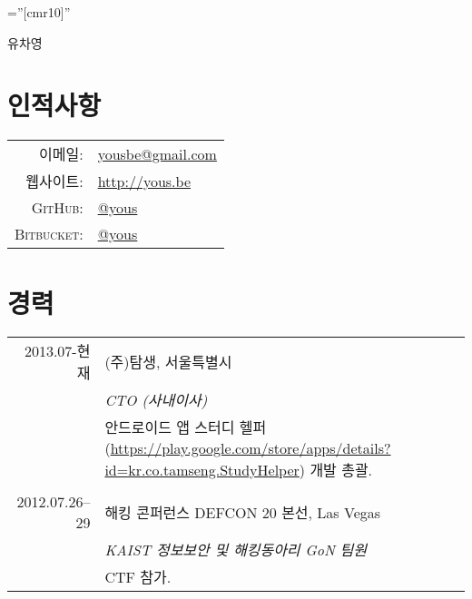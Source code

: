 \documentclass[a4paper,10pt]{article}
\begin{document}

\pagestyle{empty} %

\font\fb=''[cmr10]'' %

\par{\centering
{\Huge 유차영
}\bigskip\par}

\section{인적사항}

\begin{tabular}{rl}
  \textsc{이메일:}    & \href{mailto:yousbe@gmail.com}{yousbe@gmail.com} \\
  \textsc{웹사이트:}  & \url{http://yous.be} \\
  \textsc{GitHub:}    & \href{https://github.com/yous}{@yous} \\
  \textsc{Bitbucket:} & \href{https://bitbucket.org/yous}{@yous}
\end{tabular}

\section{경력}
\begin{tabular}{r|p{11cm}}
  \textsc{2013.07-현재} & \textsc{(주)탐생}, 서울특별시 \\
  & \emph{CTO (사내이사)} \\
  & 안드로이드 앱 스터디 헬퍼(\url{https://play.google.com/store/apps/details?id=kr.co.tamseng.StudyHelper}) 개발 총괄. \\
  \multicolumn{2}{c}{} \\

  \textsc{2012.07.26--29} & \textsc{해킹 콘퍼런스 DEFCON 20 본선}, Las Vegas \\
  & \emph{KAIST 정보보안 및 해킹동아리 GoN 팀원} \\
  & CTF 참가.
\end{tabular}
\end{document}
